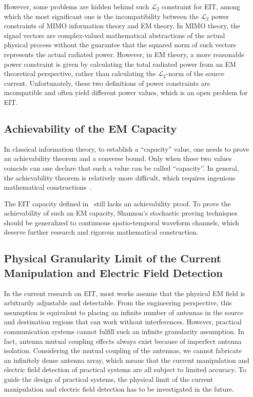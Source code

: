\documentclass[journal,twocolumn]{IEEEtran}
\begin{document}
However, some problems are hidden behind such $\mathcal{L}_2$ constraint for EIT, among which the most significant one is the incompatibility between the $\mathcal{L}_2$ power constraints of MIMO information theory and EM theory.  
In MIMO theory, the signal vectors are complex-valued mathematical abstractions of the actual physical process without the guarantee that the squared norm of such vectors represents the actual radiated power. 
However, in EM theory, a more reasonable power constraint is given by calculating the total radiated power from an EM theoretical perspective, rather than calculating the $\mathcal{L}_2$-norm of the source current. 
Unfortunately, these two definitions of power constraints are incompatible and often yield different power values, which is an open problem for EIT. 


\subsection{Achievability of the EM Capacity}
In classical information theory, to establish a ``capacity'' value, one needs to prove an achievability theorem and a converse bound. Only when these two values coincide can one declare that such a value can be called  ``capacity''. In general, the achievability theorem is relatively more difficult, which requires ingenious mathematical constructions~\cite{shannon1948mathematical}. 

The EIT capacity defined in~\cite{wan2022mutual,zhang2022pdma} still lacks an achievability proof. 
To prove the achievability of such an EM capacity, Shannon's stochastic proving techniques should be generalized to continuous spatio-temporal waveform channels, which deserve further research and rigorous mathematical construction.  

\subsection{Physical Granularity Limit of the Current Manipulation and Electric Field Detection}
In the current research on EIT, most works assume that the physical EM field is arbitrarily adjustable and detectable. From the engineering perspective, this assumption is equivalent to placing an infinite number of antennas in the source and destination regions that can work without interferences. However, practical communication systems cannot fulfill such an infinite granularity assumption. In fact, antenna mutual coupling effects always exist because of imperfect antenna isolation. Considering the mutual coupling of the antennas, we cannot fabricate an infinitely dense antenna array, which means that the current manipulation and electric field detection of practical systems are all subject to limited accuracy. To guide the design of practical systems, the physical limit of the current manipulation and electric field detection has to be investigated in the future. 
\end{document}

